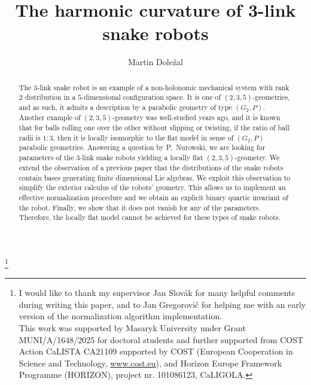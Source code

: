 \documentclass{amsart}
\theoremstyle{plain}
\theoremstyle{definition}
\theoremstyle{remark}
\begin{document}

\title{The harmonic curvature of 3-link snake robots} %
\author{Martin Dole\v{z}al}
\address{Department of Mathematics and Statistics, Masaryk University, Brno, Czech Republic, and Department of Mathematics, University of Hradec Kr\'{a}lov\'{e}, Hradec Kr\'{a}lov\'{e}, Czech Republic}

\begin{abstract}
    The $3$-link snake robot is an example of a non-holonomic mechanical system with rank $2$ distribution in a $5$-dimensional configuration space. It is one of $(2,3,5)$-geometries, and as such, it admits a description by a parabolic geometry of type $(G_2,P)$. Another example of $(2,3,5)$-geometry was well-studied years ago, and it is known that for balls rolling one over the other without slipping or twisting, if the ratio of ball radii is $1:3$, then it is locally isomorphic to the flat model in sense of $(G_2,P)$ parabolic geometries. Answering a question by P.~Nurowski, we are looking for parameters of the $3$-link snake robots yielding a locally flat $(2,3,5)$-geometry. We extend the observation of a previous paper that the distributions of the snake robots contain bases generating finite dimensional Lie algebras. We exploit this observation to simplify the exterior calculus of the robots' geometry. This allows us to implement an effective normalization procedure and we obtain an explicit binary quartic invariant of the robot. Finally, we show that it does not vanish for any of the parameters. Therefore, the locally flat model cannot be achieved for these types of snake robots.
\end{abstract}



\thanks{I would like to thank my supervisor Jan Slov\'{a}k for many helpful comments during writing this paper, and to Jan Gregorovi\v{c} for helping me with an early version of the normalization algorithm implementation.\\ \hspace*{1.5em}
This work was supported by Masaryk University under Grant MUNI/A/1648/2025 for doctoral students and further supported from COST Action CaLISTA CA21109 supported by COST (European Cooperation in Science and Technology, \url{www.cost.eu}), and Horizon Europe Framework Programme (HORIZON), project nr. 101086123, CaLIGOLA.
}
\end{document}
